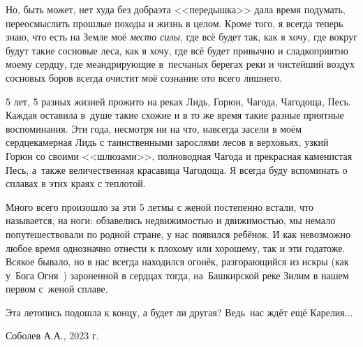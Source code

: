 {Но, быть может, нет худа без добра\mdash эта <<передышка>> дала время подумать, переосмыслить прошлые походы и жизнь в целом. Кроме того, я всегда теперь знаю, что есть на Земле моё \textit{место силы}, где всё будет так, как я хочу, где вокруг будут такие сосновые леса, как я хочу, где всё будет привычно и сладко\sdash приятно моему сердцу, где меандрирующие в~песчаных берегах реки и чистейший воздух сосновых боров всегда очистит моё сознание ото всего лишнего.

5 лет, 5 разных жизней прожито на реках Лидь, Горюн, Чагода, Чагодоща, Песь. Каждая оставила в~душе такие схожие и в то же время такие разные приятные воспоминания. Эти года, несмотря ни на что, навсегда засели в моём сердце\mdash камерная Лидь с таинственными зарослями лесов в верховьях, узкий Горюн со своими <<шлюзами>>, полноводная Чагода и прекрасная каменистая Песь, а~также величественная красавица Чагодоща. Я всегда буду вспоминать о сплавах в этих краях с теплотой.

Много всего произошло за эти 5 лет\mdash мы с женой постепенно встали, что называется, на ноги: обзавелись недвижимостью и движимостью, мы немало попутешествовали по родной стране, у нас появился ребёнок. И как невозможно любое время однозначно отнести к плохому или хорошему, так и эти года\mdash тоже. Всякое бывало, но в нас всегда находился огонёк, разгорающийся из искры (как у~Бога Огня~\cite{Территория}) зароненной в сердцах тогда, на~Башкирской реке Зилим в нашем первом с~женой сплаве.

Эта летопись подошла к концу, а будет ли другая? Ведь~нас ждёт ещё Карелия$\ldots$


}
\vspace{5mm}
\begin{flushright}
Соболев А.А., 2023 г.
\end{flushright}
